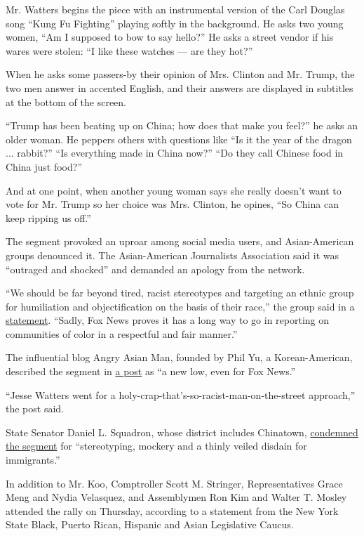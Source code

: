 Mr. Watters begins the piece with an instrumental version of the Carl
Douglas song ``Kung Fu Fighting'' playing softly in the background. He
asks two young women, ``Am I supposed to bow to say hello?'' He asks a
street vendor if his wares were stolen: ``I like these watches --- are
they hot?''

When he asks some passers-by their opinion of Mrs. Clinton and Mr.
Trump, the two men answer in accented English, and their answers are
displayed in subtitles at the bottom of the screen.

``Trump has been beating up on China; how does that make you feel?'' he
asks an older woman. He peppers others with questions like ``Is it the
year of the dragon ... rabbit?'' ``Is everything made in China now?''
``Do they call Chinese food in China just food?''

And at one point, when another young woman says she really doesn't want
to vote for Mr. Trump so her choice was Mrs. Clinton, he opines, ``So
China can keep ripping us off.''

The segment provoked an uproar among social media users, and
Asian-American groups denounced it. The Asian-American Journalists
Association said it was ``outraged and shocked'' and demanded an apology
from the network.

``We should be far beyond tired, racist stereotypes and targeting an
ethnic group for humiliation and objectification on the basis of their
race,'' the group said in a
\href{http://www.aaja.org/watters-world/}{statement}. ``Sadly, Fox News
proves it has a long way to go in reporting on communities of color in a
respectful and fair manner.''

The influential blog Angry Asian Man, founded by Phil Yu, a
Korean-American, described the segment in
\href{http://blog.angryasianman.com/2016/10/fox-news-airs-appallingly-racist-anti.html}{a
post} as ``a new low, even for Fox News.''

``Jesse Watters went for a holy-crap-that's-so-racist-man-on-the-street
approach,'' the post said.

State Senator Daniel L. Squadron, whose district includes Chinatown,
\href{https://www.nysenate.gov/newsroom/articles/daniel-l-squadron/squadron-condemns-mocking-chinatown-oreilly-factor-segment}{condemned
the segment} for ``stereotyping, mockery and a thinly veiled disdain for
immigrants.''

In addition to Mr. Koo, Comptroller Scott M. Stringer, Representatives
Grace Meng and Nydia Velasquez, and Assemblymen Ron Kim and Walter T.
Mosley attended the rally on Thursday, according to a statement from the
New York State Black, Puerto Rican, Hispanic and Asian Legislative
Caucus.

